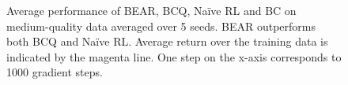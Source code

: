 \begin{figure}
\begin{subfigure}[t]{0.23\textwidth}
    \end{subfigure}
    \caption{\label{fig:mediocre} \footnotesize Average performance of BEAR, BCQ, Na\"ive RL and BC on medium-quality data averaged over 5 seeds. BEAR outperforms both BCQ and Na\"ive RL. Average return over the training data is indicated by the magenta line. One step on the x-axis corresponds to 1000 gradient steps.}
\end{figure}


\vspace{-0.2cm}
